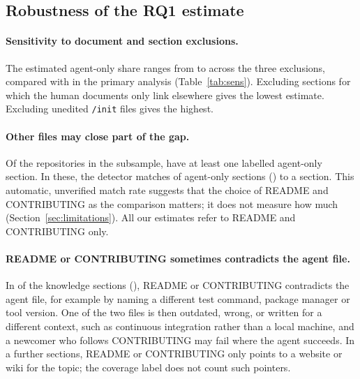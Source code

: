 \documentclass[sigconf,nonacm]{acmart}
\begin{document}


\subsection{Robustness of the RQ1 estimate}\label{sec:robustness}



\paragraph{Sensitivity to document and section exclusions.} The estimated agent-only share ranges
from \sensLow{} to \sensHigh{} across the three exclusions, compared with \agentOnlyOverall{}
in the primary analysis (Table~\ref{tab:sens}). Excluding sections for which the human documents
only link elsewhere gives the lowest estimate. Excluding unedited \texttt{/init} files gives the
highest.

\paragraph{Other files may close part of the gap.} Of the \nDocsSubsampleFetched{} repositories in
the  subsample, \docsCheckRepos{} have at least one labelled agent-only section. In
these, the detector matches \docsCheckCovered{} of \docsCheckUnits{} agent-only sections
(\docsCheckShare) to a  section. This automatic, unverified match rate suggests that the
choice of README and CONTRIBUTING as the comparison matters; it does not measure how much
(Section~\ref{sec:limitations}). All our estimates refer to README and CONTRIBUTING only.

\paragraph{README or CONTRIBUTING sometimes contradicts the agent file.} In \nConflictUnits{} of the
\nKnowledgeUnits{} knowledge sections (\conflictShare), README or CONTRIBUTING contradicts the agent
file, for example by naming a different test command, package manager or tool version. One of the
two files is then outdated, wrong, or written for a different context, such as continuous
integration rather than a local machine, and a newcomer who follows CONTRIBUTING may fail where the
agent succeeds. In a further \nLinksOutUnits{} sections, README or CONTRIBUTING only points to a
website or wiki for the topic; the coverage label does not count such pointers.
\end{document}
